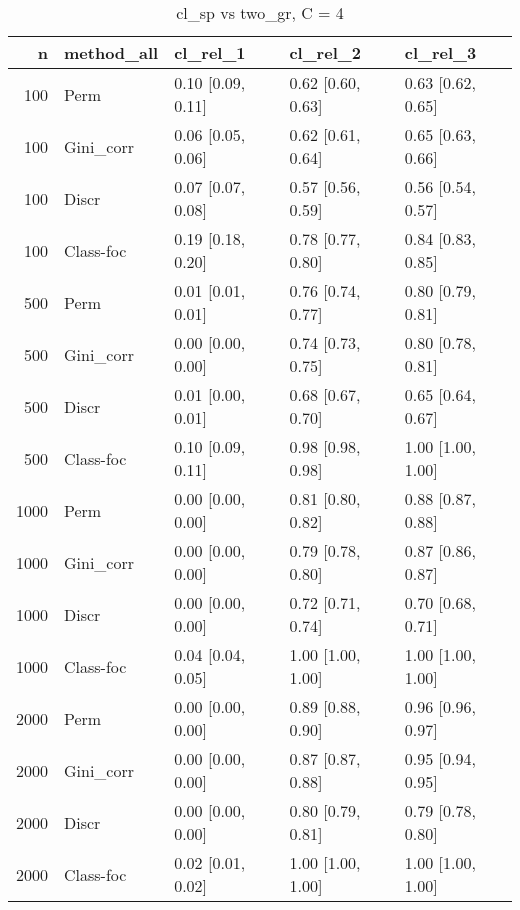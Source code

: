 \begin{table}[ht]
\centering
\caption{cl\_sp vs two\_gr, C = 4} 
\begin{tabular}{rllll}
  \hline
n & method\_all & cl\_rel\_1 & cl\_rel\_2 & cl\_rel\_3 \\ 
  \hline
100 & Perm & 0.10 [0.09, 0.11] & 0.62 [0.60, 0.63] & 0.63 [0.62, 0.65] \\ 
  100 & Gini\_corr & 0.06 [0.05, 0.06] & 0.62 [0.61, 0.64] & 0.65 [0.63, 0.66] \\ 
  100 & Discr & 0.07 [0.07, 0.08] & 0.57 [0.56, 0.59] & 0.56 [0.54, 0.57] \\ 
  100 & Class-foc & 0.19 [0.18, 0.20] & 0.78 [0.77, 0.80] & 0.84 [0.83, 0.85] \\ 
   \hline 500 & Perm & 0.01 [0.01, 0.01] & 0.76 [0.74, 0.77] & 0.80 [0.79, 0.81] \\ 
  500 & Gini\_corr & 0.00 [0.00, 0.00] & 0.74 [0.73, 0.75] & 0.80 [0.78, 0.81] \\ 
  500 & Discr & 0.01 [0.00, 0.01] & 0.68 [0.67, 0.70] & 0.65 [0.64, 0.67] \\ 
  500 & Class-foc & 0.10 [0.09, 0.11] & 0.98 [0.98, 0.98] & 1.00 [1.00, 1.00] \\ 
   \hline 1000 & Perm & 0.00 [0.00, 0.00] & 0.81 [0.80, 0.82] & 0.88 [0.87, 0.88] \\ 
  1000 & Gini\_corr & 0.00 [0.00, 0.00] & 0.79 [0.78, 0.80] & 0.87 [0.86, 0.87] \\ 
  1000 & Discr & 0.00 [0.00, 0.00] & 0.72 [0.71, 0.74] & 0.70 [0.68, 0.71] \\ 
  1000 & Class-foc & 0.04 [0.04, 0.05] & 1.00 [1.00, 1.00] & 1.00 [1.00, 1.00] \\ 
   \hline 2000 & Perm & 0.00 [0.00, 0.00] & 0.89 [0.88, 0.90] & 0.96 [0.96, 0.97] \\ 
  2000 & Gini\_corr & 0.00 [0.00, 0.00] & 0.87 [0.87, 0.88] & 0.95 [0.94, 0.95] \\ 
  2000 & Discr & 0.00 [0.00, 0.00] & 0.80 [0.79, 0.81] & 0.79 [0.78, 0.80] \\ 
  2000 & Class-foc & 0.02 [0.01, 0.02] & 1.00 [1.00, 1.00] & 1.00 [1.00, 1.00] \\ 
   \hline
\end{tabular}
\end{table}
